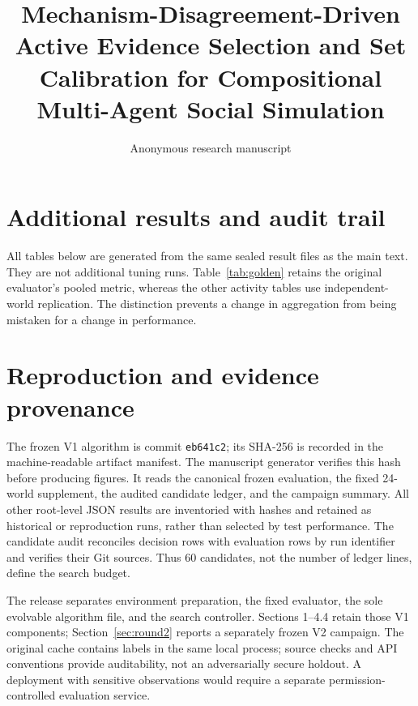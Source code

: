 \documentclass[10pt]{article}
\title{Mechanism-Disagreement-Driven Active Evidence Selection and Set Calibration for Compositional Multi-Agent Social Simulation}
\author{Anonymous research manuscript}
\date{}
\begin{document}
\maketitle








\clearpage
\appendix
\section{Additional results and audit trail}
\label{app:results}
All tables below are generated from the same sealed result files as the main text. They are not additional tuning runs. Table~\ref{tab:golden} retains the original evaluator's pooled metric, whereas the other activity tables use independent-world replication. The distinction prevents a change in aggregation from being mistaken for a change in performance.





\FloatBarrier
\section{Reproduction and evidence provenance}
\label{app:reproduction}
The frozen V1 algorithm is commit \texttt{eb641c2}; its SHA-256 is recorded in the machine-readable artifact manifest. The manuscript generator verifies this hash before producing figures. It reads the canonical frozen evaluation, the fixed 24-world supplement, the audited candidate ledger, and the campaign summary. All other root-level JSON results are inventoried with hashes and retained as historical or reproduction runs, rather than selected by test performance. The candidate audit reconciles decision rows with evaluation rows by run identifier and verifies their Git sources. Thus 60 candidates, not the number of ledger lines, define the search budget.

The release separates environment preparation, the fixed evaluator, the sole evolvable algorithm file, and the search controller. Sections 1--4.4 retain those V1 components; Section~\ref{sec:round2} reports a separately frozen V2 campaign. The original cache contains labels in the same local process; source checks and API conventions provide auditability, not an adversarially secure holdout. A deployment with sensitive observations would require a separate permission-controlled evaluation service.
\end{document}
